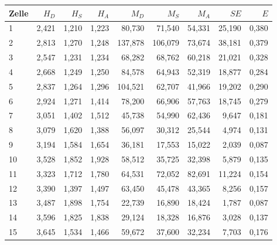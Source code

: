 

\begin{center}
    \centering
    \begin{tabular}{lrrrrrrrr}
        \toprule
        Zelle &  $H_D$ &  $H_S$ &  $H_A$ &    $M_D$ &    $M_S$ &   $M_A$ &     $SE$ &     $E$ \\
        \midrule
        1     & 2,421 & 1,210 & 1,223 &  80,730 &  71,540 & 54,331 & 25,190 & 0,380 \\
        2     & 2,813 & 1,270 & 1,248 & 137,878 & 106,079 & 73,674 & 38,181 & 0,379 \\
        3     & 2,547 & 1,231 & 1,234 &  68,282 &  68,762 & 60,218 & 21,021 & 0,328 \\
        4     & 2,668 & 1,249 & 1,250 &  84,578 &  64,943 & 52,319 & 18,877 & 0,284 \\
        5     & 2,837 & 1,264 & 1,296 & 104,521 &  62,707 & 41,966 & 19,202 & 0,290 \\
        6     & 2,924 & 1,271 & 1,414 &  78,200 &  66,906 & 57,763 & 18,745 & 0,279 \\
        7     & 3,051 & 1,402 & 1,512 &  45,738 &  54,990 & 62,436 &  9,647 & 0,181 \\
        8     & 3,079 & 1,620 & 1,388 &  56,097 &  30,312 & 25,544 &  4,974 & 0,131 \\
        9     & 3,194 & 1,584 & 1,654 &  36,181 &  17,553 & 15,022 &  2,039 & 0,087 \\
        10    & 3,528 & 1,852 & 1,928 &  58,512 &  35,725 & 32,398 &  5,879 & 0,135 \\
        11    & 3,323 & 1,712 & 1,780 &  64,531 &  72,052 & 82,691 & 11,224 & 0,154 \\
        12    & 3,390 & 1,397 & 1,497 &  63,450 &  45,478 & 43,365 &  8,256 & 0,157 \\
        13    & 3,487 & 1,898 & 1,754 &  22,739 &  16,890 & 18,424 &  1,787 & 0,087 \\
        14    & 3,596 & 1,825 & 1,838 &  29,124 &  18,328 & 16,876 &  3,028 & 0,137 \\
        15    & 3,645 & 1,534 & 1,466 &  59,672 &  37,600 & 32,234 &  7,703 & 0,176 \\
        \bottomrule
    \end{tabular}
    \label{tab:CY}
\end{center}

